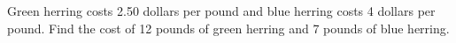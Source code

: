 Green herring costs 2.50 dollars per pound and blue herring costs 4 dollars per pound. Find the cost of 12 pounds of green herring and 7 pounds of blue herring.
